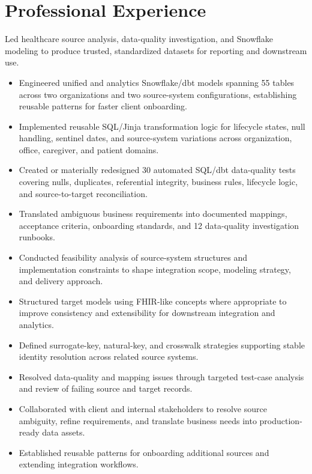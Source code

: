 \section{Professional Experience}
\label{sec:professional}

Led healthcare source analysis, data-quality investigation, and Snowflake modeling to produce trusted, standardized datasets for reporting and downstream use.
\begin{itemize}
  \item Engineered unified and analytics Snowflake/dbt models spanning 55 tables across two organizations and two source-system configurations, establishing reusable patterns for faster client onboarding.
  \item Implemented reusable SQL/Jinja transformation logic for lifecycle states, null handling, sentinel dates, and source-system variations across organization, office, caregiver, and patient domains.
  \item Created or materially redesigned 30 automated SQL/dbt data-quality tests covering nulls, duplicates, referential integrity, business rules, lifecycle logic, and source-to-target reconciliation.
  \item Translated ambiguous business requirements into documented mappings, acceptance criteria, onboarding standards, and 12 data-quality investigation runbooks.
  \item Conducted feasibility analysis of source-system structures and implementation constraints to shape integration scope, modeling strategy, and delivery approach.
  \item Structured target models using FHIR-like concepts where appropriate to improve consistency and extensibility for downstream integration and analytics.
  \item Defined surrogate-key, natural-key, and crosswalk strategies supporting stable identity resolution across related source systems.
  \item Resolved data-quality and mapping issues through targeted test-case analysis and review of failing source and target records.
  \item Collaborated with client and internal stakeholders to resolve source ambiguity, refine requirements, and translate business needs into production-ready data assets.
  \item Established reusable patterns for onboarding additional sources and extending integration workflows.
\end{itemize}

